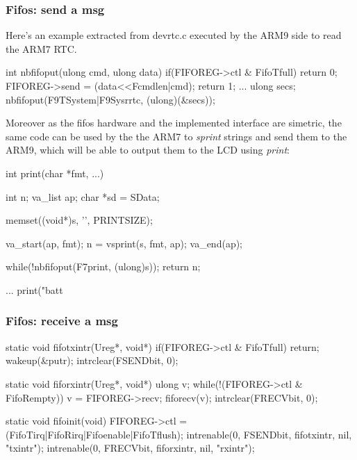 \documentclass[11pt]{p9article}
\begin{document}
\subsubsection{Fifos:  send a msg}

Here's an example extracted from devrtc.c executed by the ARM9 side to read the ARM7 RTC.

\begin{center}
\begin{boxedverbatim}
int
nbfifoput(ulong cmd, ulong data)
{
    if(FIFOREG->ctl & FifoTfull)
        return 0;
    FIFOREG->send = (data<<Fcmdlen|cmd);
    return 1;
}
...
ulong secs;
nbfifoput(F9TSystem|F9Sysrrtc, (ulong)(&secs));
\end{boxedverbatim}
\end{center}

Moreover as the fifos hardware and the implemented interface are simetric,
the same code can be used by the the ARM7 to \emph{sprint} strings and send them
to the ARM9, which will be able to output them to the LCD using \emph{print}:

\begin{center}
\begin{boxedverbatim}
int
print(char *fmt, ...)
{
    int n;
    va_list ap;
    char *sd  = SData;

    memset((void*)s, '\0', PRINTSIZE);

    va_start(ap, fmt);
    n = vsprint(s, fmt, ap);
    va_end(ap);

    while(!nbfifoput(F7print, (ulong)s));
    return n;
}
...
print("batt %
\end{boxedverbatim}
\end{center}

\subsubsection{Fifos: receive a msg}

\begin{center}
\begin{boxedverbatim}	
static void
fifotxintr(Ureg*, void*)
{
    if(FIFOREG->ctl & FifoTfull)
        return;
    wakeup(&putr);
    intrclear(FSENDbit, 0);
}

static void
fiforxintr(Ureg*, void*)
{
    ulong v;
    while(!(FIFOREG->ctl & FifoRempty)) {
        v = FIFOREG->recv;
        fiforecv(v);
    }
    intrclear(FRECVbit, 0);
}

static void
fifoinit(void)
{
    FIFOREG->ctl = (FifoTirq|FifoRirq|Fifoenable|FifoTflush);
    intrenable(0, FSENDbit, fifotxintr, nil, "txintr");
    intrenable(0, FRECVbit, fiforxintr, nil, "rxintr");
}
\end{boxedverbatim}
\end{center}
\end{document}

